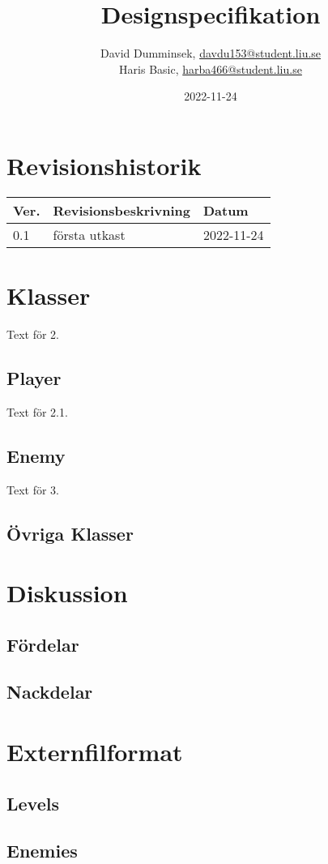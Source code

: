 \documentclass{TDP005mall}
\author{David Dumminsek, \url{davdu153@student.liu.se}\\
  Haris Basic, \url{harba466@student.liu.se}\\}
\title{Designspecifikation}
\date{2022-11-24}
\begin{document}
\projectpage
\section{Revisionshistorik}
\begin{table}[!h]
\begin{tabularx}{\linewidth}{|l|X|l|}
\hline
Ver. & Revisionsbeskrivning & Datum \\\hline
  0.1 & första utkast & 2022-11-24\\\hline
\end{tabularx}
\end{table}


\section{Klasser}
Text för 2.

\subsection{Player}
Text för 2.1.

\subsection{Enemy}
Text för 3.

\subsection{Övriga Klasser}
\section{Diskussion}
\subsection{Fördelar}
\subsection{Nackdelar}
\section{Externfilformat}
\subsection{Levels}
\subsection{Enemies}
\end{document}
